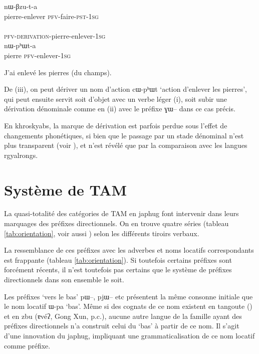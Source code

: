 \documentclass[oldfontcommands,oneside,a4paper,11pt]{article}
\newcommand{\ipa}[1]{{\phon \mbox{#1}}} %
\begin{document}
   \begin{exe}
\ex \label{ex:incorporation}
\begin{xlist}[(ii)]
\gll     \ipa{cɯ-pʰɯt} \ipa{nɯ-βzu-t-a}  \\
 pierre-enlever \textsc{pfv}-faire-\textsc{pst-1sg} \\
\gll     \ipa{nɯ-ɣɯ-cɯ-pʰɯt-a}  \\
  \textsc{pfv}-\textsc{derivation}-pierre-enlever-\textsc{1sg} \\
\gll     \ipa{cɯ} \ipa{nɯ-pʰɯt-a}  \\
  pierre \textsc{pfv}-enlever-\textsc{1sg} \\
  \end{xlist}
 \glt  J'ai enlevé les pierres (du champs).
 
\end{exe}   


De (iii), on peut dériver un nom d'action \ipa{cɯ-pʰɯt} `action d'enlever les pierres', qui peut ensuite servit soit d'objet avec un verbe léger (i), soit subir une dérivation dénominale comme en (ii) avec le préfixe \ipa{ɣɯ--} dans ce cas précis.


En khroskyabs, la marque de dérivation est parfois perdue sous l'effet de changements phonétiques, si bien que le passage par un stade dénominal n'est plus transparent (voir \citealt[185-9]{lai13affixale}), et n'est révélé que par la comparaison avec les langues rgyalrongs.

\section{Système de TAM}
La quasi-totalité des catégories de TAM en japhug font intervenir dans leurs marquages des préfixes directionnels. On en trouve quatre séries (tableau \ref{tab:orientation}, voir aussi \citealt[266]{jacques14linking}) selon les différents tiroirs verbaux. 

La ressemblance de ces préfixes avec les adverbes et noms locatifs correspondants est frappante (tableau \ref{tab:orientation}). Si toutefois certains préfixes sont forcément récents, il n'est toutefois pas certains que le système de préfixes directionnels dans son ensemble le soit.

Les préfixes `vers le bas' \ipa{pɯ--}, \ipa{pjɯ--} etc présentent la même consonne initiale que le nom locatif \ipa{ɯ-pa} `bas'. Même si des cognats de ce nom existent en tangoute (\citealt{jacques14tangoute}) et en zbu (\ipa{ɐvéʔ}, Gong Xun, p.c.), aucune autre langue de la famille ayant des préfixes directionnels n'a construit celui du `bas' à partir de ce nom. Il s'agit d'une innovation du japhug, impliquant une grammaticalisation de ce nom locatif comme préfixe.
\end{document}
